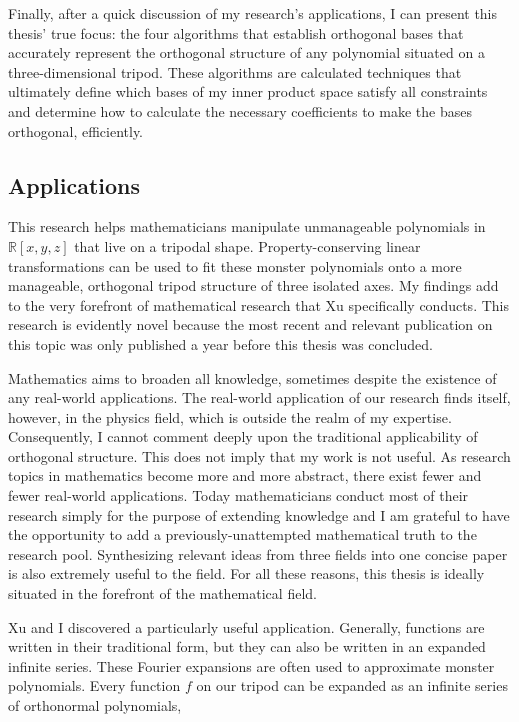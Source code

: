 \documentclass[letterpaper, 12pt]{article}
\begin{document}
Finally, after a quick discussion of my research's applications, I can present this thesis' true focus: the four algorithms that establish orthogonal bases that accurately represent the orthogonal structure of any polynomial situated on a three-dimensional tripod. These algorithms are calculated techniques that ultimately define which bases of my inner product space satisfy all constraints and determine how to calculate the necessary coefficients to make the bases orthogonal, efficiently.







\newpage
\begin{centering}\section{Applications}\end{centering}

This research helps mathematicians manipulate unmanageable polynomials in $\mathbb{R}[x, y, z]$ that live on a tripodal shape. Property-conserving linear transformations can be used to fit these monster polynomials onto a more manageable, orthogonal tripod structure of three isolated axes. My findings add to the very forefront of mathematical research that Xu specifically conducts. This research is evidently novel because the most recent and relevant publication on this topic was only published a year before this thesis was concluded.

Mathematics aims to broaden all knowledge, sometimes despite the existence of any real-world applications. The real-world application of our research finds itself, however, in the physics field, which is outside the realm of my expertise. Consequently, I cannot comment deeply upon the traditional applicability of orthogonal structure. This does not imply that my work is not useful. As research topics in mathematics become more and more abstract, there exist fewer and fewer real-world applications. Today mathematicians conduct most of their research simply for the purpose of extending knowledge and I am grateful to have the opportunity to add a previously-unattempted mathematical truth to the research pool. Synthesizing relevant ideas from three fields into one concise paper is also extremely useful to the field. For all these reasons, this thesis is ideally situated in the forefront of the mathematical field.

Xu and I discovered a particularly useful application. Generally, functions are written in their traditional form, but they can also be written in an expanded infinite series. These Fourier expansions are often used to approximate monster polynomials. Every function $f$ on our tripod can be expanded as an infinite series of orthonormal polynomials,
\end{document}
